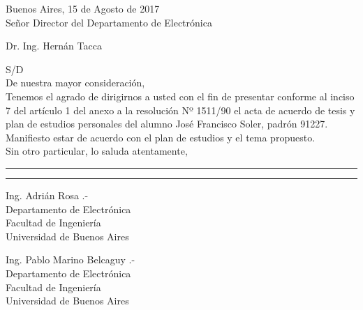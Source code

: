 \hfill Buenos Aires, 15 de Agosto de 2017
\\

\noindent Señor Director del Departamento de Electrónica

\noindent Dr. Ing. Hernán Tacca

\noindent S/D
\\

\noindent De nuestra mayor consideración,
\\

Tenemos el agrado de dirigirnos a usted con el fin de presentar conforme al inciso 7 del artículo 1 del anexo a la resolución Nº 1511/90 el acta de acuerdo de tesis y plan de estudios personales del alumno José Francisco Soler, padrón 91227.
\\

Manifiesto estar de acuerdo con el plan de estudios y el tema propuesto.
\\

Sin otro particular, lo saluda atentamente,

\vspace*{3cm}
\noindent\rule{6cm}{0.4pt}\hfill\rule{6cm}{0.4pt}

\noindent\parbox{6cm}{Ing. Adrián Rosa .-\\Departamento de Electrónica\\Facultad de Ingeniería\\Universidad de Buenos Aires}\hfill\parbox{6cm}{Ing. Pablo Marino Belcaguy .-\\Departamento de Electrónica\\Facultad de Ingeniería\\Universidad de Buenos Aires}